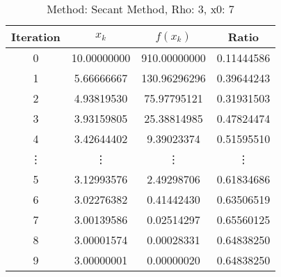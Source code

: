 \begin{table}
\centering
\caption{Method: Secant Method, Rho: 3, x0: 7}
\label{tab:table_Secant_Method_3_7}
\begin{tabular}{c c c c}
\toprule
Iteration &       $x_k$ &     $f(x_k)$ &      Ratio \\
\midrule
        0 & 10.00000000 & 910.00000000 & 0.11444586 \\
        1 &  5.66666667 & 130.96296296 & 0.39644243 \\
        2 &  4.93819530 &  75.97795121 & 0.31931503 \\
        3 &  3.93159805 &  25.38814985 & 0.47824474 \\
        4 &  3.42644402 &   9.39023374 & 0.51595510 \\
   \vdots &      \vdots &       \vdots &     \vdots \\
        5 &  3.12993576 &   2.49298706 & 0.61834686 \\
        6 &  3.02276382 &   0.41442430 & 0.63506519 \\
        7 &  3.00139586 &   0.02514297 & 0.65560125 \\
        8 &  3.00001574 &   0.00028331 & 0.64838250 \\
        9 &  3.00000001 &   0.00000020 & 0.64838250 \\
\bottomrule
\end{tabular}
\end{table}
